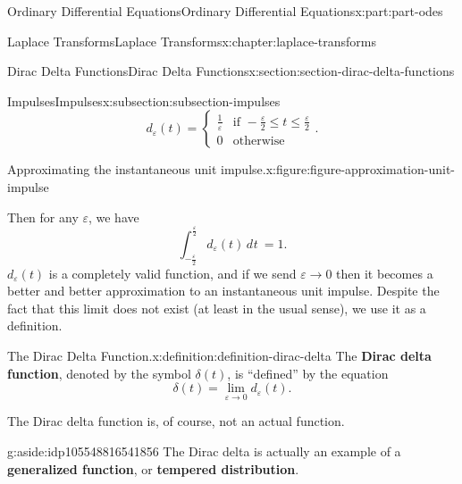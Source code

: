 \documentclass[twoside,10pt,]{book}
\newcommand{\terminology}[1]{\textbf{#1}}
\numberwithin{equation}{part}
\providecommand{\dd}[2][]{\, d^{#1} #2\ }
\newcommand{\Int}[2]{\int_{#1}^{#2}}
\newcommand{\limit}[2]{\lim_{#1\to#2}}
\newcommand{\amp}{&}
\begin{document}
\begin{partptx}{Ordinary Differential Equations}{}{Ordinary Differential Equations}{}{}{x:part:part-odes}
\begin{chapterptx}{Laplace Transforms}{}{Laplace Transforms}{}{}{x:chapter:laplace-transforms}
\begin{sectionptx}{Dirac Delta Functions}{}{Dirac Delta Functions}{}{}{x:section:section-dirac-delta-functions}
\begin{subsectionptx}{Impulses}{}{Impulses}{}{}{x:subsection:subsection-impulses}
\begin{equation*}
d_{\varepsilon}(t) = 
\begin{cases}
\frac{1}{\varepsilon} \amp\text{if }-\frac{\varepsilon}{2}\leq t\leq \frac{\varepsilon}{2} \\
0 \amp\text{otherwise}  
\end{cases}.
\end{equation*}
\begin{figureptx}{Approximating the instantaneous unit impulse.}{x:figure:figure-approximation-unit-impulse}{}%
\begin{image}{0}{1}{0}%
%
\end{image}%
\tcblower
\end{figureptx}%
%
\par
Then for any \(\varepsilon\), we have%
\begin{equation*}
\Int{-\frac{\varepsilon}{2}}{\frac{\varepsilon}{2}}d_{\varepsilon}(t)\dd{t} = 1.
\end{equation*}
\(d_{\varepsilon}(t)\) is a completely valid function, and if we send \(\varepsilon\to0\) then it becomes a better and better approximation to an instantaneous unit impulse. Despite the fact that this limit does not exist (at least in the usual sense), we use it as a definition.%
\begin{definition}{The Dirac Delta Function.}{x:definition:definition-dirac-delta}%
The \terminology{Dirac delta function}, denoted by the symbol \(\delta(t)\), is ``defined'' by the equation%
\begin{equation*}
\delta(t) = \limit{\varepsilon}{0}d_{\varepsilon}(t).
\end{equation*}
%
\end{definition}
The Dirac delta function is, of course, not an actual function. \begin{aside}{}{g:aside:idp105548816541856}%
The Dirac delta is actually an example of a \terminology{generalized function}, or \terminology{tempered distribution}.%
\end{aside}

\end{subsectionptx}
\end{sectionptx}
\end{chapterptx}
\end{partptx}
\end{document}
